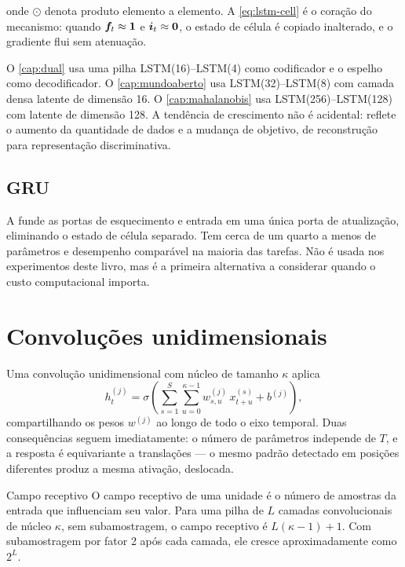 onde $\odot$ denota produto elemento a elemento. A \cref{eq:lstm-cell} é o coração do
mecanismo: quando $\bm{f}_t \approx \bm{1}$ e $\bm{i}_t \approx \bm{0}$, o
estado de célula é copiado inalterado, e o gradiente flui sem atenuação.

\begin{destaque}
O \cref{cap:dual} usa uma pilha LSTM(16)--LSTM(4) como codificador e o espelho como
decodificador. O \cref{cap:mundoaberto} usa LSTM(32)--LSTM(8) com camada densa latente
de dimensão 16. O \cref{cap:mahalanobis} usa LSTM(256)--LSTM(128) com latente de
dimensão 128. A tendência de crescimento não é acidental: reflete o aumento da
quantidade de dados e a mudança de objetivo, de reconstrução para representação
discriminativa.
\end{destaque}

\subsection{GRU}

A  funde as portas de
esquecimento e entrada em uma única porta de atualização, eliminando o estado de célula
separado. Tem cerca de um quarto a menos de parâmetros e desempenho comparável na
maioria das tarefas. Não é usada nos experimentos deste livro, mas é a primeira
alternativa a considerar quando o custo computacional importa.

\section{Convoluções unidimensionais}

Uma convolução unidimensional com núcleo de tamanho $\kappa$ aplica
\begin{equation}
  h_t^{(j)} = \sigma\left( \sum_{s=1}^{S} \sum_{u=0}^{\kappa-1}
  w^{(j)}_{s,u}\, x_{t+u}^{(s)} + b^{(j)} \right),
  \label{eq:conv1d}
\end{equation}
compartilhando os pesos $w^{(j)}$ ao longo de todo o eixo temporal. Duas consequências
seguem imediatamente: o número de parâmetros independe de $T$, e a resposta é
equivariante a translações --- o mesmo padrão detectado em posições diferentes produz a
mesma ativação, deslocada.

\begin{definicao}{Campo receptivo}
O campo receptivo de uma unidade é o número de amostras da entrada que influenciam seu
valor. Para uma pilha de $L$ camadas convolucionais de núcleo $\kappa$, sem
subamostragem, o campo receptivo é $L(\kappa - 1) + 1$. Com subamostragem por fator 2
após cada camada, ele cresce aproximadamente como $2^{L}$.
\end{definicao}

